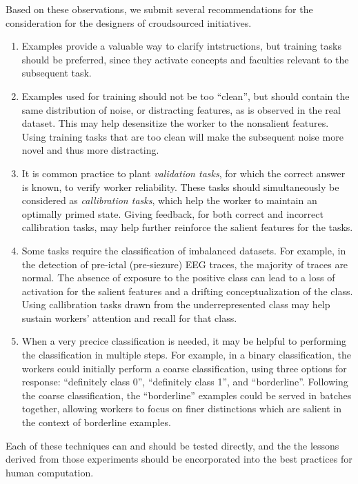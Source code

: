 \documentclass[12pt]{article}
\begin{document}
Based on these observations, we submit several recommendations for the 
consideration for the designers of croudsourced initiatives.
\begin{enumerate}
	\item{
		Examples provide a valuable way to clarify intstructions, but 
		training tasks should be preferred, since they activate concepts and 
		faculties relevant to the subsequent task.
	}
	\item{
		Examples used for training should not be too ``clean'', but should 
		contain the same distribution of noise, or distracting features, as 
		is observed in the real dataset.
		This may help desensitize the worker to the nonsalient features.
		Using training tasks that are too clean will make the subsequent noise
		more novel and thus more distracting.
	}
	\item{
		It is common practice to plant \textit{validation tasks}, for which the
		correct answer is known, to verify worker reliability.
		These tasks should simultaneously be considered as 
		\textit{callibration tasks}, which help
		the worker to maintain an optimally primed state.
		Giving feedback, for both correct and incorrect callibration tasks, 
		may help further reinforce the salient features for the tasks.
	}
	\item{
		Some tasks require the classification of imbalanced datasets.
		For example, in the detection of pre-ictal (pre-siezure) EEG traces,
		the majority of traces are normal.  The absence of exposure to the 
		positive class can lead to a loss of activation for the
		salient features and a drifting conceptualization of the class.
		Using callibration tasks drawn from the underrepresented class may 
		help sustain workers' attention and recall for that class.
	}
	\item{
		When a very precice classification is needed, it may be helpful to
		performing the classification in multiple steps.  For example, in a 
		binary classification, the workers could initially perform a coarse
		classification, using three options for response: 
		``definitely class 0'', ``definitely class 1'', and 
		``borderline''.  Following the coarse classification, the 
		``borderline'' examples could be served in batches together, 
		allowing workers to focus on finer distinctions which are salient 
		in the context of borderline examples.
	}
\end{enumerate}

Each of these techniques can and should be tested directly, and the the
lessons derived from those experiments should be encorporated into the best 
practices for human computation.
\end{document}

